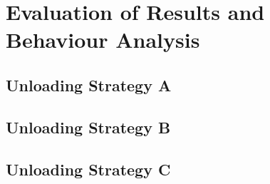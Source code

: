 \chapter{Evaluation of Results and Behaviour Analysis}
\label{cha:Eval}

\section{Unloading Strategy A}
\label{sec:MethodA}


\section{Unloading Strategy B}
\label{sec:MethodB}

\section{Unloading Strategy C}
\label{sec:MethodC}